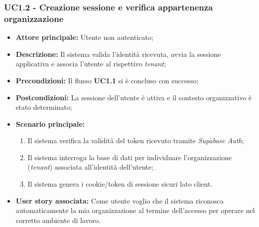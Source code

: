 \subsubsection{UC1.2 - Creazione sessione e verifica appartenenza organizzazione}
\begin{itemize}
    \item \textbf{Attore principale:} Utente non autenticato;
    \item \textbf{Descrizione:} Il sistema valida l'identità ricevuta, avvia la sessione applicativa e associa l'utente al rispettivo \textit{tenant};
    \item \textbf{Precondizioni:} Il flusso \textbf{UC1.1} si è concluso con successo;
    \item \textbf{Postcondizioni:} La sessione dell'utente è attiva e il contesto organizzativo è stato determinato;
    \item \textbf{Scenario principale:}
    \begin{enumerate}
        \item Il sistema verifica la validità del token ricevuto tramite \textit{Supabase Auth};
        \item Il sistema interroga la base di dati per individuare l'organizzazione (\textit{tenant}) associata all'identità dell'utente;
        \item Il sistema genera i cookie/token di sessione sicuri lato client.
    \end{enumerate}
    \item \textbf{User story associata:} Come utente voglio che il sistema riconosca automaticamente la mia organizzazione al termine dell'accesso per operare nel corretto ambiente di lavoro.
\end{itemize}

